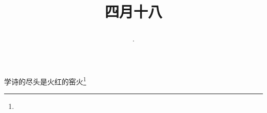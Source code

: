\title{\date[d=25,m=5,y=2024][year:cn-y,年,month:cn,day:cn,日,·,weekday]·四月十八 }
学诗的尽头是火红的窑火\footnote{ }

